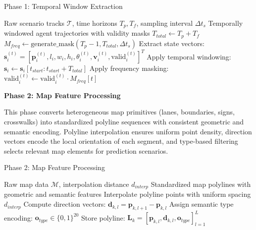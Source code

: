 \begin{algorithm}[H]
\caption{Phase 1: Temporal Window Extraction}
\label{alg:phase1_temporal}
\begin{algorithmic}[1]
\REQUIRE Raw scenario tracks \(\mathcal{T}\), time horizons \(T_p, T_f\), sampling interval \(\Delta t_{s}\)
\ENSURE Temporally windowed agent trajectories with validity masks
\STATE \(T_{total} \leftarrow T_p + T_f\) 
\STATE \(M_{freq} \leftarrow \text{generate\_mask}(T_p - 1, T_{total}, \Delta t_{s})\) 
    \STATE Extract state vectors: \(\boldsymbol{s}_i^{(t)} = [\boldsymbol{p}_i^{(t)}, l_i, w_i, h_i, \theta_i^{(t)}, \boldsymbol{v}_i^{(t)}, \text{valid}_i^{(t)}]^T\)
    \STATE Apply temporal windowing: \(\boldsymbol{s}_i \leftarrow \boldsymbol{s}_i[t_{start} : t_{start} + T_{total}]\)
    \STATE Apply frequency masking: \(\text{valid}_i^{(t)} \leftarrow \text{valid}_i^{(t)} \cdot M_{freq}[t]\)
\ENDFOR
\end{algorithmic}
\end{algorithm}

\textbf{Phase 2: Map Feature Processing}

This phase converts heterogeneous map primitives (lanes, boundaries, signs, crosswalks) into standardized polyline sequences with consistent geometric and semantic encoding. Polyline interpolation ensures uniform point density, direction vectors encode the local orientation of each segment, and type-based filtering selects relevant map elements for prediction scenarios.

\begin{algorithm}[H]
\caption{Phase 2: Map Feature Processing}
\label{alg:phase2_map}
\begin{algorithmic}[1]
\REQUIRE Raw map data \(\mathcal{M}\), interpolation distance \(d_{interp}\)
\ENSURE Standardized map polylines with geometric and semantic features
    \STATE Interpolate polyline points with uniform spacing \(d_{interp}\)
    \STATE Compute direction vectors: \(\boldsymbol{d}_{k,l} = \boldsymbol{p}_{k,l+1} - \boldsymbol{p}_{k,l}\)
    \STATE Assign semantic type encoding: \(\boldsymbol{o}_{type} \in \{0,1\}^{20}\)
    \STATE Store polyline: \(\boldsymbol{L}_k = [\boldsymbol{p}_{k,l}, \boldsymbol{d}_{k,l}, \boldsymbol{o}_{type}]_{l=1}^{L}\)
\ENDFOR
\end{algorithmic}
\end{algorithm}

